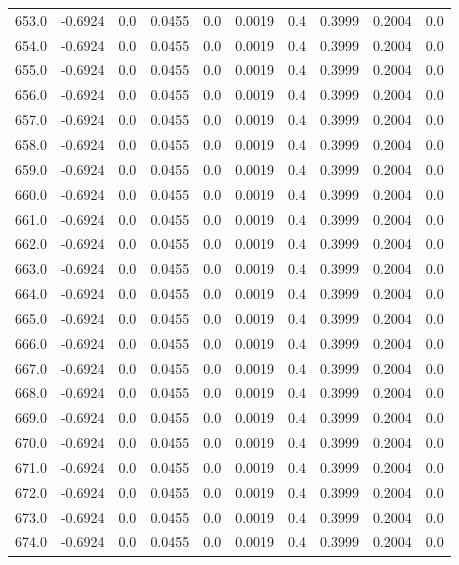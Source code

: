 \begin{longtable}{lrrrrrrrrr}
653.0 & -0.6924 & 0.0 & 0.0455 & 0.0 & 0.0019 & 0.4 & 0.3999 & 0.2004 & 0.0 \\
654.0 & -0.6924 & 0.0 & 0.0455 & 0.0 & 0.0019 & 0.4 & 0.3999 & 0.2004 & 0.0 \\
655.0 & -0.6924 & 0.0 & 0.0455 & 0.0 & 0.0019 & 0.4 & 0.3999 & 0.2004 & 0.0 \\
656.0 & -0.6924 & 0.0 & 0.0455 & 0.0 & 0.0019 & 0.4 & 0.3999 & 0.2004 & 0.0 \\
657.0 & -0.6924 & 0.0 & 0.0455 & 0.0 & 0.0019 & 0.4 & 0.3999 & 0.2004 & 0.0 \\
658.0 & -0.6924 & 0.0 & 0.0455 & 0.0 & 0.0019 & 0.4 & 0.3999 & 0.2004 & 0.0 \\
659.0 & -0.6924 & 0.0 & 0.0455 & 0.0 & 0.0019 & 0.4 & 0.3999 & 0.2004 & 0.0 \\
660.0 & -0.6924 & 0.0 & 0.0455 & 0.0 & 0.0019 & 0.4 & 0.3999 & 0.2004 & 0.0 \\
661.0 & -0.6924 & 0.0 & 0.0455 & 0.0 & 0.0019 & 0.4 & 0.3999 & 0.2004 & 0.0 \\
662.0 & -0.6924 & 0.0 & 0.0455 & 0.0 & 0.0019 & 0.4 & 0.3999 & 0.2004 & 0.0 \\
663.0 & -0.6924 & 0.0 & 0.0455 & 0.0 & 0.0019 & 0.4 & 0.3999 & 0.2004 & 0.0 \\
664.0 & -0.6924 & 0.0 & 0.0455 & 0.0 & 0.0019 & 0.4 & 0.3999 & 0.2004 & 0.0 \\
665.0 & -0.6924 & 0.0 & 0.0455 & 0.0 & 0.0019 & 0.4 & 0.3999 & 0.2004 & 0.0 \\
666.0 & -0.6924 & 0.0 & 0.0455 & 0.0 & 0.0019 & 0.4 & 0.3999 & 0.2004 & 0.0 \\
667.0 & -0.6924 & 0.0 & 0.0455 & 0.0 & 0.0019 & 0.4 & 0.3999 & 0.2004 & 0.0 \\
668.0 & -0.6924 & 0.0 & 0.0455 & 0.0 & 0.0019 & 0.4 & 0.3999 & 0.2004 & 0.0 \\
669.0 & -0.6924 & 0.0 & 0.0455 & 0.0 & 0.0019 & 0.4 & 0.3999 & 0.2004 & 0.0 \\
670.0 & -0.6924 & 0.0 & 0.0455 & 0.0 & 0.0019 & 0.4 & 0.3999 & 0.2004 & 0.0 \\
671.0 & -0.6924 & 0.0 & 0.0455 & 0.0 & 0.0019 & 0.4 & 0.3999 & 0.2004 & 0.0 \\
672.0 & -0.6924 & 0.0 & 0.0455 & 0.0 & 0.0019 & 0.4 & 0.3999 & 0.2004 & 0.0 \\
673.0 & -0.6924 & 0.0 & 0.0455 & 0.0 & 0.0019 & 0.4 & 0.3999 & 0.2004 & 0.0 \\
674.0 & -0.6924 & 0.0 & 0.0455 & 0.0 & 0.0019 & 0.4 & 0.3999 & 0.2004 & 0.0 \\

\end{longtable}
